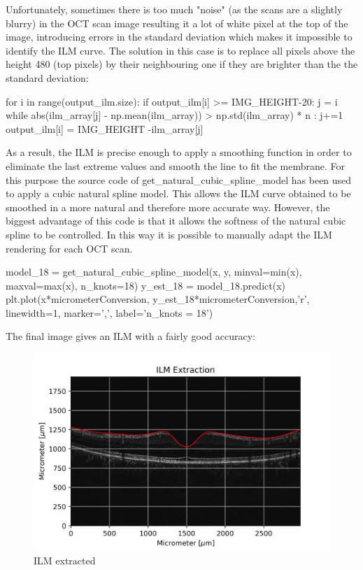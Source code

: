 \documentclass[12pt,a4paper]{scrartcl}
\begin{document}
Unfortunately, sometimes there is too much "noise" (as the scans are a slightly blurry) in the OCT scan image resulting it a lot of white pixel at the top of the image, introducing errors in the standard deviation which makes it impossible to identify the ILM curve. The solution in this case is to replace all pixels above the height 480 (top pixels) by their neighbouring one if they are brighter than the the standard deviation:
\begin{python}
for i in range(output_ilm.size):
  if output_ilm[i] >= IMG_HEIGHT-20:
    j = i
    while abs(ilm_array[j] - np.mean(ilm_array)) > np.std(ilm_array) * n :
      j+=1
      output_ilm[i] = IMG_HEIGHT -ilm_array[j]
\end{python}

As a result, the ILM is precise enough to apply a smoothing function in order to eliminate the last extreme values and smooth the line to fit the membrane. For this purpose the source code of get\_natural\_cubic\_spline\_model \cite{stackoverflow:np8}
has been used to apply a cubic natural spline model. This allows the ILM curve obtained to be smoothed in a more natural and therefore more accurate way. However, the biggest advantage of this code is that it allows the softness of the natural cubic spline to be controlled. In this way it is possible to manually adapt the ILM rendering for each OCT scan. 

\begin{python}
model_18 = get_natural_cubic_spline_model(x, y, minval=min(x), maxval=max(x), n_knots=18)
y_est_18 = model_18.predict(x)
plt.plot(x*micrometerConversion, y_est_18*micrometerConversion,'r', linewidth=1, marker=',', label='n_knots = 18')
\end{python}

The final image gives an ILM with a fairly good accuracy: 
\begin{figure}[H]
    \centering
    \includegraphics[width=1\textwidth]{./images/ILM_FinalImage.png}
    \caption{ILM extracted}
    \label{fig:ILM_extracted}
\end{figure}
\end{document}
